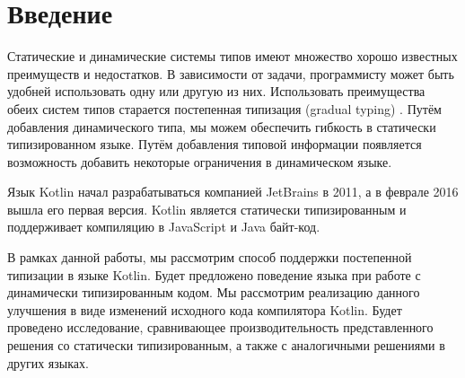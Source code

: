 \section*{Введение}

Статические и динамические системы типов имеют множество хорошо известных преимуществ и недостатков. В зависимости от задачи, программисту может быть удобней использовать одну или другую из них. Использовать преимущества обеих систем типов старается постепенная типизация (gradual typing) \cite{gradual:siek2006gradual}. Путём добавления динамического типа, мы можем обеспечить гибкость в статически типизированном языке. Путём добавления типовой информации появляется возможность добавить некоторые ограничения в динамическом языке.



Язык Kotlin начал разрабатываться компанией JetBrains в 2011, а в феврале 2016 вышла его первая версия. Kotlin является статически типизированным и поддерживает компиляцию в JavaScript и Java байт-код.

В рамках данной работы, мы рассмотрим способ поддержки постепенной типизации в языке Kotlin. Будет предложено поведение языка при работе с динамически типизированным кодом. Мы рассмотрим реализацию данного улучшения в виде изменений исходного кода компилятора Kotlin. Будет проведено исследование, сравнивающее производительность представленного решения со статически типизированным, 
а также с аналогичными решениями в других языках.



